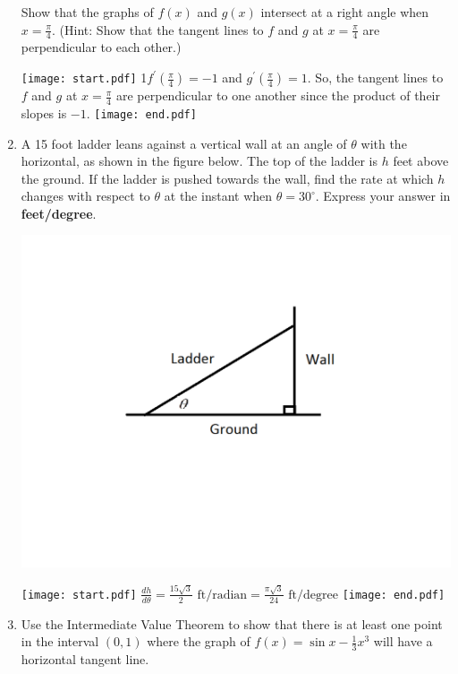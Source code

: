 \documentclass[12pt]{article}
\begin{document}
\begin{enumerate}
Show that the graphs of $f(x)$ and $g(x)$ intersect at a right angle when $x=\frac{\pi}{4}$. (Hint: Show that the tangent lines to $f$ and $g$ at $x=\frac{\pi}{4}$ are perpendicular to each other.)

\texttt{[image: start.pdf]}
{{{1\linewidth}{$f^{\prime}\left(\frac{\pi}{4}\right)=-1$ and $g^{\prime}\left(\frac{\pi}{4}\right)=1$.  So, the tangent lines to $f$ and $g$ at $x=\frac{\pi}{4}$ are perpendicular to one another since the product of their slopes is $-1$.}}}
\texttt{[image: end.pdf]}


\newpage

\item A 15 foot ladder leans against a vertical wall at an angle of $\theta$ with the horizontal, as shown in the figure below.  The top of the ladder is $h$ feet above the ground.  If the ladder is pushed towards the wall, find the rate at which $h$ changes with respect to $\theta$ at the instant when $\theta=30^{\circ }$.  Express your answer in {\bf feet/degree}.

\begin{center}
\includegraphics[scale=0.5]{wall.pdf}
\end{center}

\texttt{[image: start.pdf]}
{{$\frac{dh}{d\theta}=\frac{15\sqrt{3}}{2} \text{ ft/radian}=\frac{\pi\sqrt{3}}{24} \text{ ft/degree}$}}
\texttt{[image: end.pdf]}


\item Use the Intermediate Value Theorem to show that there is at least one point in the interval $(0,1)$ where the graph of $f(x)=\sin{x}-\frac{1}{3}x^3$ will have a horizontal tangent line.


\end{enumerate}
\end{document}
